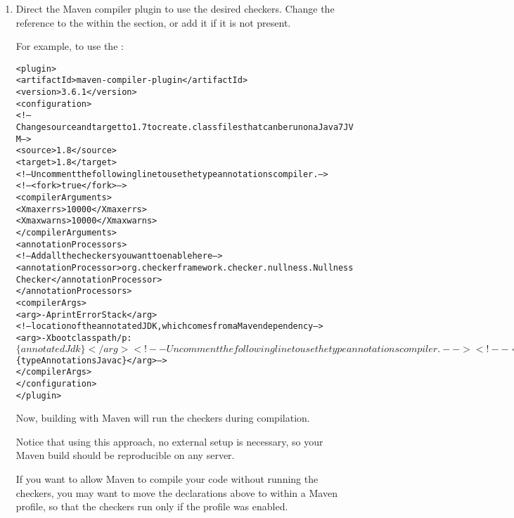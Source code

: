\begin{enumerate}
\begin{alltt}
  <plugin>
    <!-- This plugin will set properties values using dependency information -->
    <groupId>org.apache.maven.plugins</groupId>
    <artifactId>maven-dependency-plugin</artifactId>
    <executions>
      <execution>
        <goals>
          <goal>properties</goal>
        </goals>
      </execution>
    </executions>
  </plugin>
\end{alltt}


\item Direct the Maven compiler plugin to use the desired checkers.
Change the reference to the  within the 
section, or add it if it is not present.

For example, to use the :

\begin{mysmall}
\begin{alltt}
  <plugin>
    <artifactId>maven-compiler-plugin</artifactId>
    <version>3.6.1</version>
    <configuration>
      <!-- Change source and target to 1.7 to create .class files that can be run on a Java 7 JVM -->
      <source>1.8</source>
      <target>1.8</target>
      <!-- Uncomment the following line to use the type annotations compiler. -->
      <!-- <fork>true</fork> -->
      <compilerArguments>
        <Xmaxerrs>10000</Xmaxerrs>
        <Xmaxwarns>10000</Xmaxwarns>
      </compilerArguments>
      <annotationProcessors>
        <!-- Add all the checkers you want to enable here -->
        <annotationProcessor>org.checkerframework.checker.nullness.NullnessChecker</annotationProcessor>
      </annotationProcessors>
      <compilerArgs>
        <arg>-AprintErrorStack</arg>
        <!-- location of the annotated JDK, which comes from a Maven dependency -->
        <arg>-Xbootclasspath/p:$\{annotatedJdk\}</arg>
        <!-- Uncomment the following line to use the type annotations compiler. -->
        <!-- <arg>--J-Xbootclasspath/p:$\{typeAnnotationsJavac\}</arg> -->
      </compilerArgs>
    </configuration>
  </plugin>
\end{alltt}
\end{mysmall}

Now, building with Maven will run the checkers during compilation.

Notice that using this approach, no external setup is necessary,
so your Maven build should be reproducible on any server.

If you want to allow Maven to compile your code without running the
checkers, you may want to move the declarations above to within a Maven
profile, so that the checkers run only if the profile was enabled.

\end{enumerate}


